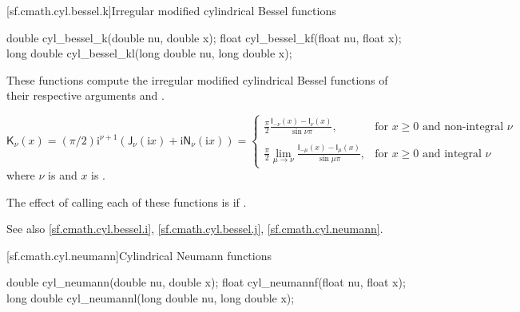 [sf.cmath.cyl.bessel.k]{Irregular modified cylindrical Bessel functions}%
%
%
%
%
%
\begin{itemdecl}
double       cyl_bessel_k(double nu, double x);
float        cyl_bessel_kf(float nu, float x);
long double  cyl_bessel_kl(long double nu, long double x);
\end{itemdecl}

\begin{itemdescr}

\pnum\effects
These functions compute
the irregular modified cylindrical Bessel functions
of their respective arguments
 and .

\pnum\returns
\[%
  \mathsf{K}_\nu(x) =
  (\pi/2)\mathrm{i}^{\nu+1} (            \mathsf{J}_\nu(\mathrm{i}x)
			    + \mathrm{i} \mathsf{N}_\nu(\mathrm{i}x)
			    )
  =
  \left\{
  \begin{array}{cl}
  \displaystyle
  \frac{\pi}{2}
  \frac{\mathsf{I}_{-\nu}(x) - \mathsf{I}_{\nu}(x)}
       {\sin \nu\pi },
  & \mbox{for $x \ge 0$ and non-integral $\nu$}
  \\
  \\
  \displaystyle
  \frac{\pi}{2}
  \lim_{\mu \rightarrow \nu} \frac{\mathsf{I}_{-\mu}(x) - \mathsf{I}_{\mu}(x)}
                                  {\sin \mu\pi },
  & \mbox{for $x \ge 0$ and integral $\nu$}
  \end{array}
  \right.
\]
where
$\nu$ is  and
$x$ is .

\pnum\remarks
The effect of calling each of these functions
is 
if .

\pnum See also \ref{sf.cmath.cyl.bessel.i}, \ref{sf.cmath.cyl.bessel.j}, \ref{sf.cmath.cyl.neumann}.
\end{itemdescr}

[sf.cmath.cyl.neumann]{Cylindrical Neumann functions}%
%
%
%
%
%
%
\begin{itemdecl}
double       cyl_neumann(double nu, double x);
float        cyl_neumannf(float nu, float x);
long double  cyl_neumannl(long double nu, long double x);
\end{itemdecl}

